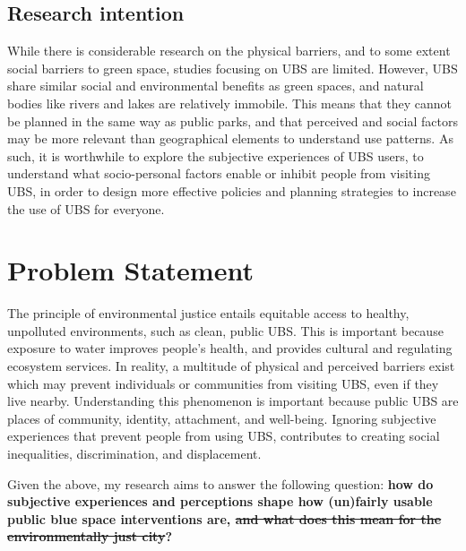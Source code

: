\documentclass{article}
\begin{document}
\subsection{Research intention}

While there is considerable research on the physical barriers, and to some extent social barriers to green space, studies focusing on UBS are limited.
However, UBS share similar social and environmental benefits as green spaces, and natural bodies like rivers and lakes are relatively immobile. This means that they cannot be planned in the same way as public parks, and that perceived and social factors may be more relevant than geographical elements to understand use patterns.
As such, it is worthwhile to explore the subjective experiences of UBS users, to understand what socio-personal factors  enable or inhibit people from visiting UBS, in order to design more effective policies and planning strategies to increase the use of UBS for everyone.


\section{Problem Statement}

The principle of environmental justice entails equitable access to healthy, unpolluted environments, such as clean, public UBS. This is important because exposure to water improves people's health, and provides cultural and regulating ecosystem services.
In reality, a multitude of physical and perceived barriers exist which may prevent individuals or communities from visiting UBS, even if they live nearby.
Understanding this phenomenon is important because public UBS are places of community, identity, attachment, and well-being. Ignoring subjective experiences that prevent people from using UBS, contributes to creating social inequalities, discrimination, and displacement.

Given the above, my research aims to answer the following question: \textbf{how do subjective experiences and perceptions shape how (un)fairly usable public blue space interventions are, \sout{and what does this mean for the environmentally just city}?}

\end{document}
